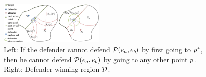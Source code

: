 \begin{figure}
\centering
\includegraphics[width=0.45\textwidth]{"fig/winning regions"}
\caption{Left: If the defender cannot defend $\bar{\mathcal{P}}(e_a,e_b)$ by first going to $p^*$, then he cannot defend $\bar{\mathcal{P}}(e_a,e_b)$ by going to any other point $p$. Right: Defender winning region $\mathcal{D}$.}
\label{fig:lemma2}
\end{figure}
%





